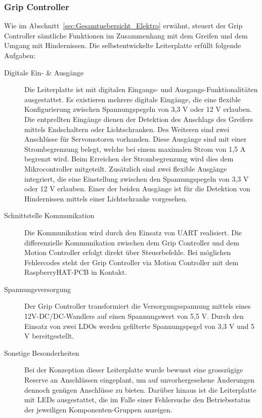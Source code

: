 \documentclass[main.tex]{subfiles} %
\begin{document}

\subsubsection{Grip Controller}
Wie im Abschnitt~\ref{sec:Gesamtuebersicht_Elektro} erwähnt, steuert der Grip
Controller sämtliche Funktionen im Zusammenhang mit dem Greifen und dem Umgang
mit Hindernissen. Die selbstentwickelte Leiterplatte erfüllt folgende Aufgaben:

\begin{description}
      \item[Digitale Ein- \& Ausgänge] Die Leiterplatte ist mit digitalen Eingangs- und
            Ausgangs-Funktionalitäten ausgestattet. Es existieren mehrere digitale
            Eingänge, die eine flexible Konfigurierung zwischen Spannungspegeln von 3,3 V
            oder 12 V erlauben. Die entprellten Eingänge dienen der Detektion des Anschlags
            des Greifers mittels Endschaltern oder Lichtschranken. Des Weiteren sind zwei
            Anschlüsse für Servomotoren vorhanden. Diese Ausgänge sind mit einer
            Strombegrenzung belegt, welche bei einem maximalen Strom von 1,5 A begrenzt
            wird. Beim Erreichen der Strombegrenzung wird dies dem Mikrocontroller
            mitgeteilt. Zusätzlich sind zwei flexible Ausgänge integriert, die eine
            Einstellung zwischen den Spannungspegeln von 3,3 V oder 12 V erlauben. Einer
            der beiden Ausgänge ist für die Detektion von Hindernissen mittels einer
            Lichtschranke vorgesehen.

      \item[Schnittstelle Kommunikation] Die Kommunikation wird durch den Einsatz von UART
            realisiert. Die differenzielle Kommunikation zwischen dem Grip Controller und
            dem Motion Controller erfolgt direkt über Steuerbefehle. Bei möglichen
            Fehlercodes steht der Grip Controller via Motion Controller mit dem
            RaspberryHAT-PCB in Kontakt.

      \item[Spannungsversorgung] Der Grip Controller transformiert die Versorgungsspannung
            mittels eines 12V-DC/DC-Wandlers auf einen Spannungswert von 5,5 V. Durch den
            Einsatz von zwei LDOs werden gefilterte Spannungspegel von 3,3 V und 5 V
            bereitgestellt.

      \item[Sonstige Besonderheiten] Bei der Konzeption dieser Leiterplatte wurde bewusst
            eine grosszügige Reserve an Anschlüssen eingeplant, um auf unvorhergesehene
            Änderungen dennoch genügen Anschlüsse zu bieten. Darüber hinaus ist die
            Leiterplatte mit LEDs ausgestattet, die im Falle einer Fehlersuche den
            Betriebsstatus der jeweiligen Komponenten-Gruppen anzeigen.
\end{description}
\end{document}
